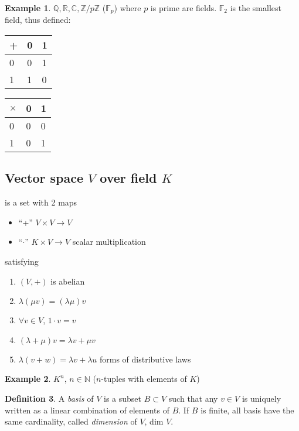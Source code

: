 \documentclass[a4paper]{article}
\theoremstyle{definition}
\newtheorem{defn}{Definition}[subsection]
\newtheorem{example}[defn]{Example}
\begin{document}
\begin{example}
$\mathbb Q, \mathbb R, \mathbb C, \mathbb Z/p \mathbb Z$ ($\mathbb F_p$) where $p$ is prime are fields.
$\mathbb F _2$ is the smallest field, thus defined:

\begin{center}
\begin{tabular}{l|ll}
+ & 0 & 1 \\ \hline
0 & 0 & 1 \\
1 & 1 & 0
\end{tabular} \quad
\begin{tabular}{l|ll}
$\times$ & 0 & 1 \\ \hline
0 & 0 & 0 \\
1 & 0 & 1
\end{tabular}
\end{center}
\end{example}

\subsection{Vector space $V$ over field $K$}
is a set with 2 maps
\begin{itemize}
	\item ``+'' $V \times V \rightarrow V$
	\item ``$\cdot$'' $K \times V \rightarrow V$ \qquad scalar multiplication
\end{itemize} satisfying
\begin{enumerate}
	\item $(V,+)$ is abelian
	\item $\lambda (\mu v) = (\lambda \mu) v$
	\item $\forall v \in V$, $1\cdot v=v$
	\item $(\lambda +\mu)v = \lambda v + \mu v$
	\item $\lambda (v+w) = \lambda v + \lambda u$  forms of distributive laws 
\end{enumerate}

\begin{example}
	$K^n$, $n\in \mathbb N$ ($n$-tuples with elements of $K$)
\end{example}

\begin{defn}
	A \textit{basis} of $V$ is a subset $B \subset V$ such that any $v \in V$ is uniquely written as a linear combination of elements of $B$. If $B$ is finite, all basis have the same cardinality, called \textit{dimension} of $V$, dim $V$.
\end{defn}
\end{document}
